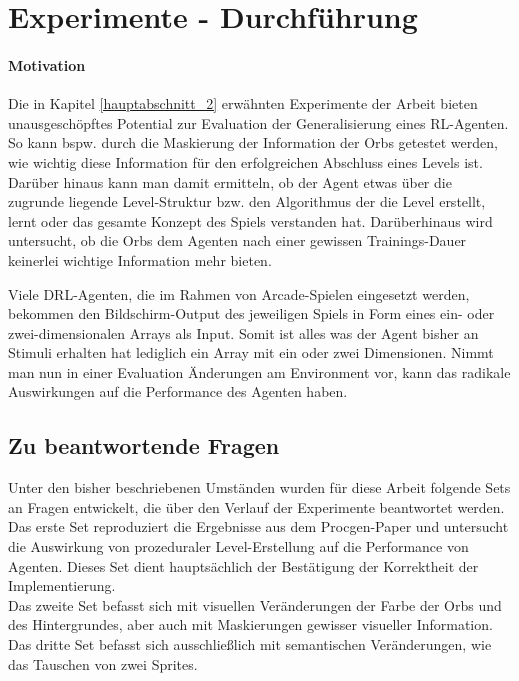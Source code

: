 \section{Experimente - Durchführung}\label{hauptabschnitt_5}
\paragraph{Motivation}\label{par_EXP_durch_motiv}

Die in Kapitel \ref{hauptabschnitt_2} erwähnten Experimente der Arbeit \cite{dubey2018investigating} bieten unausgeschöpftes Potential zur Evaluation der Generalisierung eines RL-Agenten. So kann bspw. durch die Maskierung der Information der Orbs getestet werden, wie wichtig diese Information für den erfolgreichen Abschluss eines Levels ist. Darüber hinaus kann man damit ermitteln, ob der Agent etwas über die zugrunde liegende Level-Struktur bzw. den Algorithmus der die Level erstellt, lernt oder das gesamte Konzept des Spiels verstanden hat. Darüberhinaus wird untersucht, ob die Orbs dem Agenten nach einer gewissen Trainings-Dauer keinerlei wichtige Information mehr bieten. 

Viele DRL-Agenten, die im Rahmen von Arcade-Spielen eingesetzt werden, bekommen den Bildschirm-Output des jeweiligen Spiels in Form eines ein- oder zwei-dimensionalen Arrays als Input. Somit ist alles was der Agent bisher an Stimuli erhalten hat lediglich ein Array mit ein oder zwei Dimensionen. Nimmt man nun in einer Evaluation Änderungen am Environment vor, kann das radikale Auswirkungen auf die Performance des Agenten haben. 


\subsection{Zu beantwortende Fragen}\label{subsec_EXP_durch_fragen}
Unter den bisher beschriebenen Umständen wurden für diese Arbeit folgende Sets an Fragen entwickelt, die über den Verlauf der Experimente beantwortet werden. \\
Das erste Set reproduziert die Ergebnisse aus dem Procgen-Paper \cite{cobbe2019procgen} und untersucht die Auswirkung von prozeduraler Level-Erstellung auf die Performance von Agenten. Dieses Set dient hauptsächlich der Bestätigung der Korrektheit der Implementierung.\\
Das zweite Set befasst sich mit visuellen Veränderungen der Farbe der Orbs und des Hintergrundes, aber auch mit Maskierungen gewisser visueller Information. \\
Das dritte Set befasst sich ausschließlich mit semantischen Veränderungen, wie das Tauschen von zwei Sprites.


